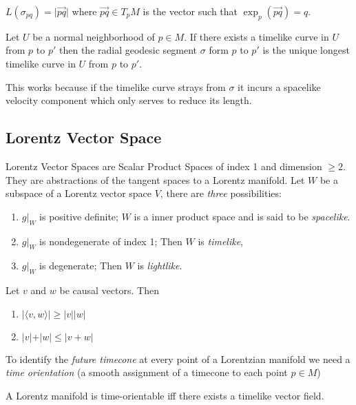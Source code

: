 \begin{lemma}
$L(\sigma_{pq}) = \rvert \overrightarrow{pq} \rvert$ where $\overrightarrow{pq}\in T_pM$ is the vector such that $\exp_p(\overrightarrow{pq})=q$.
\end{lemma}

\begin{proposition}
Let $U$ be a normal neighborhood of $p\in M$. If there exists a timelike curve in $U$ from $p$ to $p'$ then the radial geodesic segment $\sigma$ form $p$ to $p'$ is the unique longest timelike curve in $U$ from $p$ to $p'$.
\end{proposition}
This works because if the timelike curve strays from $\sigma$ it incurs a spacelike velocity component which only serves to reduce its length.

\subsection{Lorentz Vector Space}
Lorentz Vector Spaces are Scalar Product Spaces of index 1 and dimension $\ge 2$. They are abstractions of the tangent spaces to a Lorentz manifold.
Let $W$ be a subspace of a Lorentz vector space $V$, there are \emph{three} possibilities:
\begin{enumerate}
    \item $g\vert_W$ is positive definite; $W$ is a inner product space and is said to be \emph{spacelike}.
    \item $g\vert_W$ is nondegenerate of index 1; Then $W$ is \emph{timelike},
    \item $g\vert_W$ is degenerate; Then $W$ is \emph{lightlike}.
\end{enumerate}

\begin{proposition}
Let $v$ and $w$ be causal vectors. Then
\begin{enumerate}
    \item $\vert\langle v,w \rangle\vert\ge \vert v\vert \vert w\vert$
    \item $\vert v \vert + \vert w \vert \le \vert v + w \vert$
\end{enumerate}
\end{proposition}

To identify the \emph{future timecone} at every point of a Lorentzian manifold we need a \emph{time orientation} (a smooth assignment of a timecone to each point $p\in M$)
\begin{lemma}
A Lorentz manifold is time-orientable iff there exists a timelike vector field.
\end{lemma}

